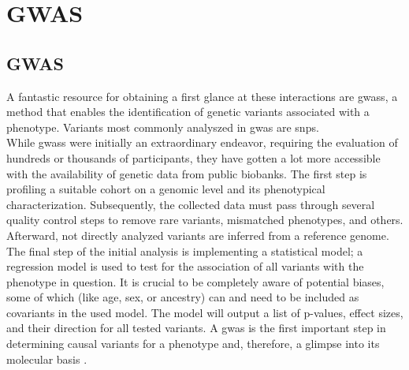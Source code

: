     \section{GWAS}
    \label{sec:gwas}

    \subsection{GWAS}
    \label{subsec:gwas_general}
    A fantastic resource for obtaining a first glance at these interactions are \acp{gwas}, a method that enables the identification of genetic variants associated with a phenotype. Variants most commonly analyszed in \ac{gwas} are \acp{snp}. \\
    While \acp{gwas} were initially an extraordinary endeavor, requiring the evaluation of hundreds or thousands of participants, they have gotten a lot more accessible with the availability of genetic data from public biobanks. The first step is profiling a suitable cohort on a genomic level and its phenotypical characterization. Subsequently, the collected data must pass through several quality control steps to remove rare variants, mismatched phenotypes, and others. Afterward, not directly analyzed variants are inferred from a reference genome. The final step of the initial analysis is implementing a statistical model; a regression model is used to test for the association of all variants with the phenotype in question. It is crucial to be completely aware of potential biases, some of which (like age, sex, or ancestry) can and need to be included as covariants in the used model. \cite{uffelmannGenomewideAssociationStudies2021, flintGWAS2013} The model will output a list of p-values, effect sizes, and their direction for all tested variants. A \ac{gwas} is the first important step in determining causal variants for a phenotype and, therefore, a glimpse into its molecular basis \cite{uffelmannGenomewideAssociationStudies2021}.


